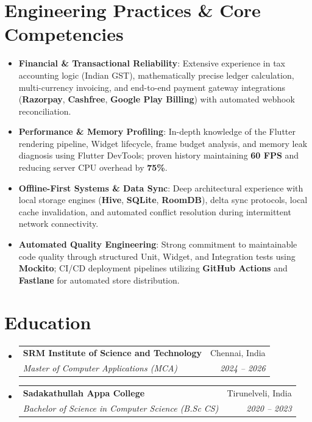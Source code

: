 \documentclass[letterpaper,10pt]{article}
\makeatletter
\newcommand{\resumeItem}[1]{
  \item\small{
    {#1 \vspace{-2pt}}
  }
}
\newcommand{\resumeSubheading}[4]{
  \vspace{-2pt}\item
    \begin{tabular*}{0.97\textwidth}[t]{l@{\extracolsep{\fill}}r}
      \textbf{#1} & #2 \\
      \textit{\small#3} & \textit{\small #4} \\
    \end{tabular*}\vspace{-6pt}
}
\newcommand{\resumeSubHeadingListStart}{\begin{itemize}[leftmargin=0.15in, label={}]}
\newcommand{\resumeSubHeadingListEnd}{\end{itemize}}
\makeatother
\begin{document}
\section{Engineering Practices \& Core Competencies}
\begin{itemize}[leftmargin=0.15in]
  \resumeItem{\textbf{Financial \& Transactional Reliability}: Extensive experience in tax accounting logic (Indian GST), mathematically precise ledger calculation, multi-currency invoicing, and end-to-end payment gateway integrations (\textbf{Razorpay}, \textbf{Cashfree}, \textbf{Google Play Billing}) with automated webhook reconciliation.}
  \resumeItem{\textbf{Performance \& Memory Profiling}: In-depth knowledge of the Flutter rendering pipeline, Widget lifecycle, frame budget analysis, and memory leak diagnosis using Flutter DevTools; proven history maintaining \textbf{60 FPS} and reducing server CPU overhead by \textbf{75\%}.}
  \resumeItem{\textbf{Offline-First Systems \& Data Sync}: Deep architectural experience with local storage engines (\textbf{Hive}, \textbf{SQLite}, \textbf{RoomDB}), delta sync protocols, local cache invalidation, and automated conflict resolution during intermittent network connectivity.}
  \resumeItem{\textbf{Automated Quality Engineering}: Strong commitment to maintainable code quality through structured Unit, Widget, and Integration tests using \textbf{Mockito}; CI/CD deployment pipelines utilizing \textbf{GitHub Actions} and \textbf{Fastlane} for automated store distribution.}
\end{itemize}

\section{Education}
  \resumeSubHeadingListStart
    \resumeSubheading
      {SRM Institute of Science and Technology}{Chennai, India}
      {Master of Computer Applications (MCA)}{2024 -- 2026}
    \resumeSubheading
      {Sadakathullah Appa College}{Tirunelveli, India}
      {Bachelor of Science in Computer Science (B.Sc CS)}{2020 -- 2023}
  \resumeSubHeadingListEnd

\end{document}
